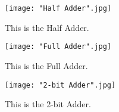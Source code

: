 \documentclass[11pt]{article}
\begin{document}
\begin{figure}[ht]\centering
	\texttt{[image: "Half Adder".jpg]}
	\caption{This is the Half Adder.}
	\label{fig:half_adder}			%
\end{figure}

\begin{figure}[ht]\centering
	\texttt{[image: "Full Adder".jpg]}
	\caption{This is the Full Adder.}
	\label{fig:full_adder}			%
\end{figure}

\begin{figure}[ht]\centering
	\texttt{[image: "2-bit Adder".jpg]}
	\caption{This is the 2-bit Adder.}
	\label{fig:2-bit_adder}			%
\end{figure}
\end{document}
